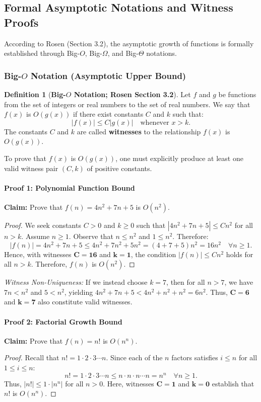\documentclass[10pt,a4paper]{article}
\theoremstyle{definition}
\newtheorem{definition}{Definition}[section]
\begin{document}
\subsection{Formal Asymptotic Notations and Witness Proofs}
According to Rosen (Section 3.2), the asymptotic growth of functions is formally established through Big-$O$, Big-$\Omega$, and Big-$\Theta$ notations.

\subsubsection{Big-$O$ Notation (Asymptotic Upper Bound)}
\begin{definition}[\textbf{Big-$O$ Notation; Rosen Section 3.2}]
Let $f$ and $g$ be functions from the set of integers or real numbers to the set of real numbers. We say that $f(x)$ is $O(g(x))$ if there exist constants $C$ and $k$ such that:
\begin{equation}
|f(x)| \le C |g(x)| \quad \text{whenever } x > k.
\end{equation}
The constants $C$ and $k$ are called \textbf{witnesses} to the relationship $f(x)$ is $O(g(x))$.
\end{definition}

To prove that $f(x)$ is $O(g(x))$, one must explicitly produce at least one valid witness pair $(C, k)$ of positive constants.

\paragraph{Proof 1: Polynomial Function Bound}
\textbf{Claim:} Prove that $f(n) = 4n^2 + 7n + 5$ is $O(n^2)$.
\begin{proof}
We seek constants $C > 0$ and $k \ge 0$ such that $|4n^2 + 7n + 5| \le C n^2$ for all $n > k$. 
Assume $n \ge 1$. Observe that $n \le n^2$ and $1 \le n^2$. Therefore:
$$|f(n)| = 4n^2 + 7n + 5 \le 4n^2 + 7n^2 + 5n^2 = (4 + 7 + 5)n^2 = 16n^2 \quad \forall n \ge 1.$$
Hence, with witnesses $\mathbf{C = 16}$ and $\mathbf{k = 1}$, the condition $|f(n)| \le C n^2$ holds for all $n > k$. 
Therefore, $f(n)$ is $O(n^2)$.
\end{proof}
\noindent\textit{Witness Non-Uniqueness:} If we instead choose $k = 7$, then for all $n > 7$, we have $7n < n^2$ and $5 < n^2$, yielding $4n^2 + 7n + 5 < 4n^2 + n^2 + n^2 = 6n^2$. Thus, $\mathbf{C = 6}$ and $\mathbf{k = 7}$ also constitute valid witnesses.

\paragraph{Proof 2: Factorial Growth Bound}
\textbf{Claim:} Prove that $f(n) = n!$ is $O(n^n)$.
\begin{proof}
Recall that $n! = 1 \cdot 2 \cdot 3 \cdots n$. Since each of the $n$ factors satisfies $i \le n$ for all $1 \le i \le n$:
$$n! = 1 \cdot 2 \cdot 3 \cdots n \le n \cdot n \cdot n \cdots n = n^n \quad \forall n \ge 1.$$
Thus, $|n!| \le 1 \cdot |n^n|$ for all $n > 0$. Here, witnesses $\mathbf{C = 1}$ and $\mathbf{k = 0}$ establish that $n!$ is $O(n^n)$.
\end{proof}
\end{document}
